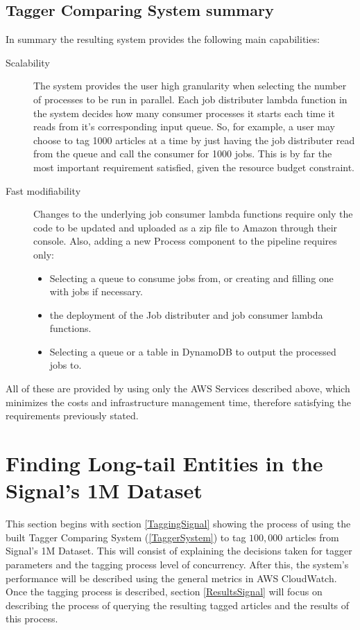  
\subsection{Tagger Comparing System summary}
In summary the resulting system provides the following main capabilities:
\begin{description}
\item[Scalability]
The system provides the user high granularity when selecting the number of processes to be run in parallel.
Each job distributer lambda function in the system decides how many consumer processes it starts each time it reads from it's corresponding input queue. 
So, for example, a user may choose to tag 1000 articles at a time by just having the job distributer read from the queue and call the consumer for 1000 jobs.
This is by far the most important requirement satisfied, given the resource budget constraint.
\item[Fast modifiability]
Changes to the underlying job consumer lambda functions require only the code to be updated and uploaded as a zip file to Amazon through their console.
Also, adding a new Process component to the pipeline requires only:
  \begin{itemize}
  \item
  Selecting a queue to consume jobs from, or creating and filling one with jobs if necessary.
  \item
  the deployment of the Job distributer and job consumer lambda functions.
  \item
  Selecting a queue or a table in DynamoDB to output the processed jobs to.
  \end{itemize}
\end{description}
All of these are provided by using only the AWS Services described above, which  minimizes the costs and infrastructure management time,
therefore satisfying the requirements previously stated. 

\section{Finding Long-tail Entities in the Signal's 1M Dataset}\label{Contrib:LongTailInSignal}
This section begins with section \ref{TaggingSignal} showing the process of using the built Tagger Comparing System (\ref{TaggerSystem}) to tag $100,000$ articles from Signal's 1M Dataset.
This will consist of explaining the decisions taken for tagger parameters and the tagging process level of concurrency.
After this, the system's performance will be described using the general metrics in AWS CloudWatch\cite{aws_cloudwatch}.
Once the tagging process is described, section \ref{ResultsSignal} will focus on describing the process of querying the resulting tagged articles and the results of this process. 

